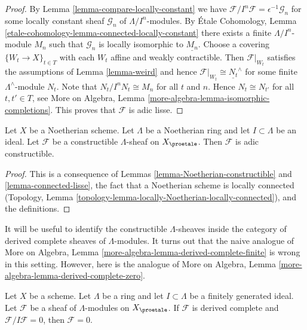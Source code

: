 \begin{proof}
By Lemma \ref{lemma-compare-locally-constant} we have
$\mathcal{F}/I^n\mathcal{F} = \epsilon^{-1}\mathcal{G}_n$
for some locally constant sheaf $\mathcal{G}_n$ of $\Lambda/I^n$-modules. By
\'Etale Cohomology, Lemma
\ref{etale-cohomology-lemma-connected-locally-constant}
there exists a finite $\Lambda/I^n$-module $M_n$ such that
$\mathcal{G}_n$ is locally isomorphic to $\underline{M_n}$.
Choose a covering $\{W_t \to X\}_{t \in T}$ with each $W_t$
affine and weakly contractible.
Then $\mathcal{F}|_{W_t}$ satisfies the assumptions of
Lemma \ref{lemma-weird}
and hence $\mathcal{F}|_{W_t} \cong \underline{N_t}^\wedge$
for some finite $\Lambda^\wedge$-module $N_t$. Note that
$N_t/I^nN_t \cong M_n$ for all $t$ and $n$. Hence
$N_t \cong N_{t'}$ for all $t, t' \in T$, see
More on Algebra, Lemma \ref{more-algebra-lemma-isomorphic-completions}.
This proves that $\mathcal{F}$ is adic lisse.
\end{proof}

\begin{lemma}
\label{lemma-Noetherian-adic-constructible}
Let $X$ be a Noetherian scheme. Let $\Lambda$ be a Noetherian ring and
let $I \subset \Lambda$ be an ideal. Let $\mathcal{F}$ be a
constructible $\Lambda$-sheaf on $X_\proetale$. Then $\mathcal{F}$
is adic constructible.
\end{lemma}

\begin{proof}
This is a consequence of Lemmas \ref{lemma-Noetherian-constructible} and
\ref{lemma-connected-lisse}, the fact that a Noetherian scheme
is locally connected
(Topology, Lemma \ref{topology-lemma-locally-Noetherian-locally-connected}),
and the definitions.
\end{proof}

\noindent
It will be useful to identify the constructible $\Lambda$-sheaves
inside the category of derived complete sheaves of $\Lambda$-modules.
It turns out that the naive analogue of
More on Algebra, Lemma \ref{more-algebra-lemma-derived-complete-finite}
is wrong in this setting. However, here
is the analogue of More on Algebra, Lemma
\ref{more-algebra-lemma-derived-complete-zero}.

\begin{lemma}
\label{lemma-derived-complete-zero}
Let $X$ be a scheme. Let $\Lambda$ be a ring and let
$I \subset \Lambda$ be a finitely generated ideal.
Let $\mathcal{F}$ be a sheaf of $\Lambda$-modules on $X_\proetale$.
If $\mathcal{F}$ is derived complete and $\mathcal{F}/I\mathcal{F} = 0$,
then $\mathcal{F} = 0$.
\end{lemma}

